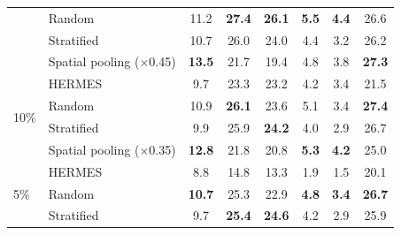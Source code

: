 \begin{table}[t]
\begin{tabular}{llcccccc}
 & Random & 11.2 & \textbf{27.4} & \textbf{26.1} & \textbf{5.5} & \textbf{4.4} & 26.6 \\
 & Stratified & 10.7 & 26.0 & 24.0 & 4.4 & 3.2 & 26.2 \\
 & Spatial pooling ($\times$0.45) & \textbf{13.5} & 21.7 & 19.4 & 4.8 & 3.8 & \textbf{27.3} \\
\midrule
\multirow{4}{*}{10\%} & HERMES & 9.7 & 23.3 & 23.2 & 4.2 & 3.4 & 21.5 \\
 & Random & 10.9 & \textbf{26.1} & 23.6 & 5.1 & 3.4 & \textbf{27.4} \\
 & Stratified & 9.9 & 25.9 & \textbf{24.2} & 4.0 & 2.9 & 26.7 \\
 & Spatial pooling ($\times$0.35) & \textbf{12.8} & 21.8 & 20.8 & \textbf{5.3} & \textbf{4.2} & 25.0 \\
\midrule
\multirow{3}{*}{5\%} & HERMES & 8.8 & 14.8 & 13.3 & 1.9 & 1.5 & 20.1 \\
 & Random & \textbf{10.7} & 25.3 & 22.9 & \textbf{4.8} & \textbf{3.4} & \textbf{26.7} \\
 & Stratified & 9.7 & \textbf{25.4} & \textbf{24.6} & 4.2 & 2.9 & 25.9 \\
\bottomrule
\end{tabular}
\end{table}
